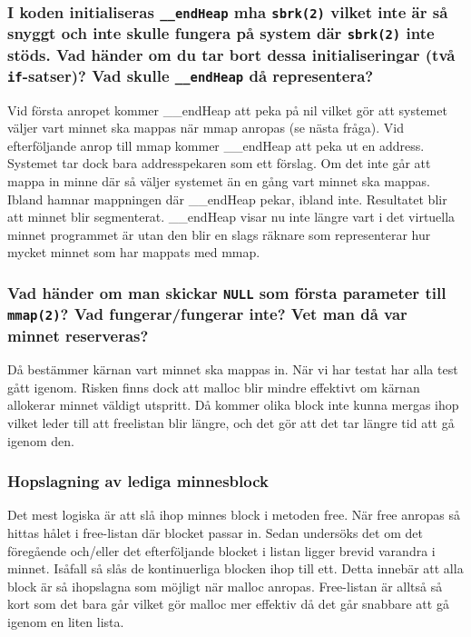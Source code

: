 \documentclass[a4paper]{article}
\begin{document}
\subsubsection*{I koden initialiseras \texttt{\_\_endHeap} mha \texttt{sbrk(2)} vilket inte är så snyggt och inte skulle fungera på system där \texttt{sbrk(2)} inte stöds. Vad händer om du tar bort dessa initialiseringar (två \texttt{if}-satser)? Vad skulle \texttt{\_\_endHeap} då representera?}
Vid första anropet kommer __endHeap att peka på nil vilket gör att systemet väljer vart minnet ska mappas när mmap anropas (se nästa fråga). Vid efterföljande anrop till mmap kommer __endHeap att peka ut en address. Systemet tar dock bara addresspekaren som ett förslag. Om det inte går att mappa in minne där så väljer systemet än en gång vart minnet ska mappas. Ibland hamnar mappningen där __endHeap pekar, ibland inte. Resultatet blir att minnet blir segmenterat. __endHeap visar nu inte längre vart i det virtuella minnet programmet är utan den blir en slags räknare som representerar hur mycket minnet som har mappats med mmap.

\subsubsection*{Vad händer om man skickar \texttt{NULL} som första parameter till \texttt{mmap(2)}? Vad fungerar/fungerar inte? Vet man då var minnet reserveras?}
Då bestämmer kärnan vart minnet ska mappas in. När vi har testat har alla test gått igenom. Risken finns dock att malloc blir mindre effektivt om kärnan allokerar minnet väldigt utspritt. Då kommer olika block inte kunna mergas ihop vilket leder till att freelistan blir längre, och det gör att det tar längre tid att gå igenom den.


\subsubsection*{Hopslagning av lediga minnesblock }
Det mest logiska är att slå ihop minnes block i metoden free. När free anropas så hittas hålet i free-listan där blocket passar in. Sedan undersöks det om det föregående och/eller det efterföljande blocket i listan ligger brevid varandra i minnet. Isåfall så slås de kontinuerliga blocken ihop till ett. Detta innebär att alla block är så ihopslagna som möjligt när malloc anropas. Free-listan är alltså så kort som det bara går vilket gör malloc mer effektiv då det går snabbare att gå igenom en liten lista.
\end{document}
